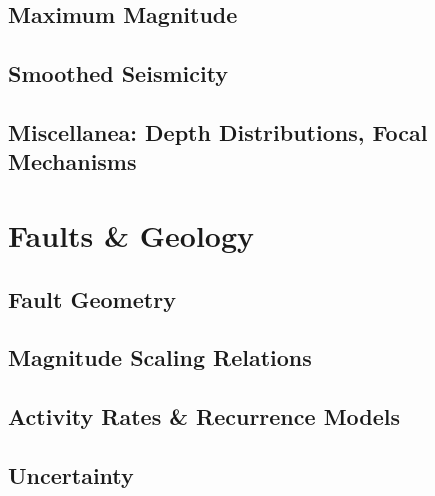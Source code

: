 \documentclass[11pt,a4paper,headings=small,dvips]{scrbook}
\begin{document}
\chapter{Maximum Magnitude}
  \label{chap: mmax}
  
  
\chapter{Smoothed Seismicity}

\chapter{Miscellanea: Depth Distributions, Focal Mechanisms}

\part{Faults \& Geology}	

\chapter{Fault Geometry}
  
  
\chapter{Magnitude Scaling Relations}
  
  
\chapter{Activity Rates \& Recurrence Models}
  

\chapter{Uncertainty}
\end{document}
